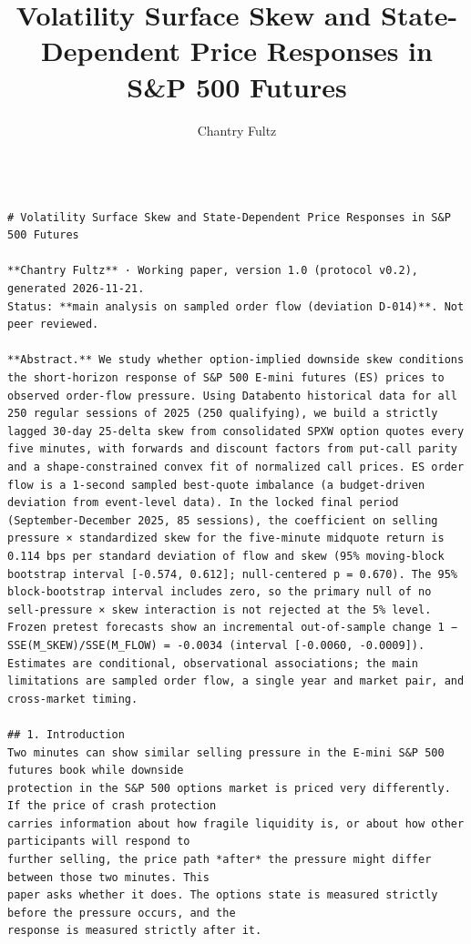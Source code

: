 \documentclass[11pt]{article}
\title{Volatility Surface Skew and State-Dependent Price Responses in S\&P 500 Futures}
\author{Chantry Fultz}
\begin{document}
\maketitle
\begin{verbatim}

# Volatility Surface Skew and State-Dependent Price Responses in S&P 500 Futures

**Chantry Fultz** · Working paper, version 1.0 (protocol v0.2), generated 2026-11-21.
Status: **main analysis on sampled order flow (deviation D-014)**. Not peer reviewed.

**Abstract.** We study whether option-implied downside skew conditions the short-horizon response of S&P 500 E-mini futures (ES) prices to observed order-flow pressure. Using Databento historical data for all 250 regular sessions of 2025 (250 qualifying), we build a strictly lagged 30-day 25-delta skew from consolidated SPXW option quotes every five minutes, with forwards and discount factors from put-call parity and a shape-constrained convex fit of normalized call prices. ES order flow is a 1-second sampled best-quote imbalance (a budget-driven deviation from event-level data). In the locked final period (September-December 2025, 85 sessions), the coefficient on selling pressure × standardized skew for the five-minute midquote return is 0.114 bps per standard deviation of flow and skew (95% moving-block bootstrap interval [-0.574, 0.612]; null-centered p = 0.670). The 95% block-bootstrap interval includes zero, so the primary null of no sell-pressure × skew interaction is not rejected at the 5% level. Frozen pretest forecasts show an incremental out-of-sample change 1 − SSE(M_SKEW)/SSE(M_FLOW) = -0.0034 (interval [-0.0060, -0.0009]). Estimates are conditional, observational associations; the main limitations are sampled order flow, a single year and market pair, and cross-market timing.

## 1. Introduction
Two minutes can show similar selling pressure in the E-mini S&P 500 futures book while downside
protection in the S&P 500 options market is priced very differently. If the price of crash protection
carries information about how fragile liquidity is, or about how other participants will respond to
further selling, the price path *after* the pressure might differ between those two minutes. This
paper asks whether it does. The options state is measured strictly before the pressure occurs, and the
response is measured strictly after it.


\end{verbatim}
\end{document}
